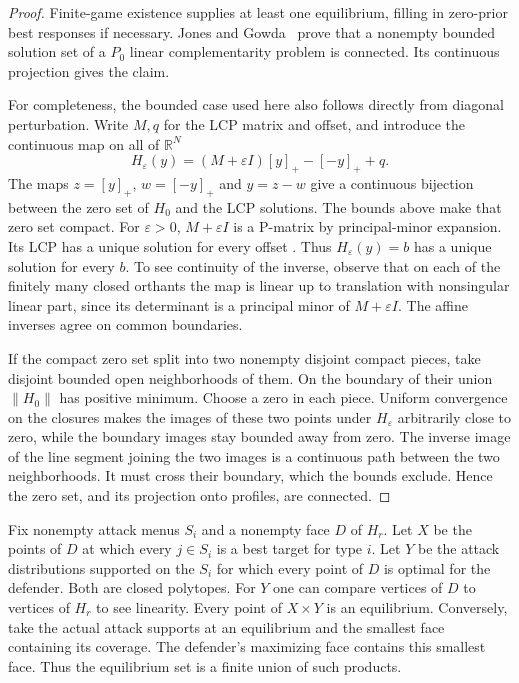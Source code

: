 \documentclass[11pt,oneside,openany,notitlepage]{report}
\begin{document}
\begin{proof}
Finite-game existence supplies at least one equilibrium, filling in
zero-prior best responses if necessary. Jones and Gowda~\cite{jg} prove
that a nonempty bounded solution set of a \(P_0\) linear complementarity
problem is connected. Its continuous projection gives the claim.

For completeness, the bounded case used here also follows directly from
diagonal perturbation. Write \(M,q\) for the LCP matrix and offset, and
introduce the continuous map on all of \(\mathbb R^N\)
\[
  H_\varepsilon(y)=(M+\varepsilon I)[y]_+-[-y]_+ +q .
\]
The maps \(z=[y]_+\), \(w=[-y]_+\) and \(y=z-w\) give a continuous
bijection between the zero set of \(H_0\) and the LCP solutions. The bounds above make that zero set compact. For \(\varepsilon>0\), \(M+\varepsilon I\) is a P-matrix by
principal-minor expansion. Its LCP has a unique solution for every offset
\cite[Proposition~2.6]{book}. Thus \(H_\varepsilon(y)=b\) has a unique
solution for every \(b\). To see continuity of the inverse, observe that on each of the
finitely many closed orthants the map is linear up to translation with
nonsingular linear part, since its determinant is a principal minor of
\(M+\varepsilon I\). The affine inverses agree on common boundaries.

If the compact zero set split into two nonempty disjoint compact pieces,
take disjoint bounded open neighborhoods of them. On the boundary of
their union \(\|H_0\|\) has positive minimum. Choose a zero in each
piece. Uniform convergence on the closures makes the images of these two
points under \(H_\varepsilon\) arbitrarily close to zero, while the
boundary images stay bounded away from zero. The inverse image of the
line segment joining the two images is a continuous path between the two
neighborhoods. It must cross their boundary, which the bounds exclude.
Hence the zero set, and its projection onto profiles, are connected.
\end{proof}

Fix nonempty attack menus \(S_i\) and a nonempty face \(D\) of \(H_r\).
Let \(X\) be the points of \(D\) at which every \(j\in S_i\) is a best
target for type \(i\). Let \(Y\) be the attack distributions supported on
the \(S_i\) for which every point of \(D\) is optimal for the defender.
Both are closed polytopes. For \(Y\) one can compare vertices of \(D\) to
vertices of \(H_r\) to see linearity. Every point of \(X\times Y\) is an
equilibrium. Conversely, take the actual attack supports at an equilibrium
and the smallest face containing its coverage. The defender's maximizing
face contains this smallest face. Thus the equilibrium set is a finite
union of such products.
\end{document}

